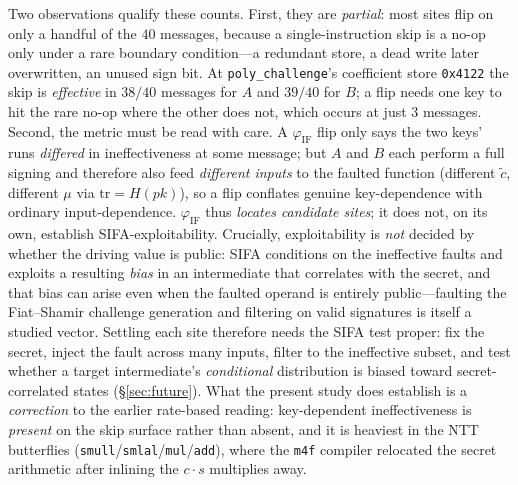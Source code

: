 \documentclass[11pt]{article}
\newcommand{\code}[1]{\texttt{#1}}
\begin{document}
Two observations qualify these counts. First, they are \emph{partial}: most sites flip
on only a handful of the $40$ messages, because a single-instruction skip is a no-op
only under a rare boundary condition---a redundant store, a dead write later
overwritten, an unused sign bit. At \code{poly\_challenge}'s coefficient store
\code{0x4122} the skip is \emph{effective} in $38/40$ messages for $A$ and $39/40$ for
$B$; a flip needs one key to hit the rare no-op where the other does not, which occurs
at just $3$ messages. Second, the metric must be read with care. A
$\varphi_{\mathrm{IF}}$ flip only says the two keys' runs \emph{differed} in
ineffectiveness at some message; but $A$ and $B$ each perform a full signing and
therefore also feed \emph{different inputs} to the faulted function (different
$\tilde c$, different $\mu$ via $\mathrm{tr}=H(pk)$), so a flip conflates genuine
key-dependence with ordinary input-dependence. $\varphi_{\mathrm{IF}}$ thus
\emph{locates candidate sites}; it does not, on its own, establish
SIFA-exploitability. Crucially, exploitability is \emph{not} decided by whether the
driving value is public: SIFA conditions on the ineffective faults and exploits a
resulting \emph{bias} in an intermediate that correlates with the secret, and that
bias can arise even when the faulted operand is entirely public---faulting the
Fiat--Shamir challenge generation and filtering on valid signatures is itself a
studied vector. Settling each site therefore needs the SIFA test proper: fix the
secret, inject the fault across many inputs, filter to the ineffective subset, and
test whether a target intermediate's \emph{conditional} distribution is biased toward
secret-correlated states (\S\ref{sec:future}). What the present study does establish
is a \emph{correction} to the earlier rate-based reading: key-dependent
ineffectiveness is \emph{present} on the skip surface rather than absent, and it is
heaviest in the NTT butterflies (\code{smull}/\code{smlal}/\code{mul}/\code{add}),
where the \code{m4f} compiler relocated the secret arithmetic after inlining the
$c\cdot s$ multiplies away.
\end{document}
